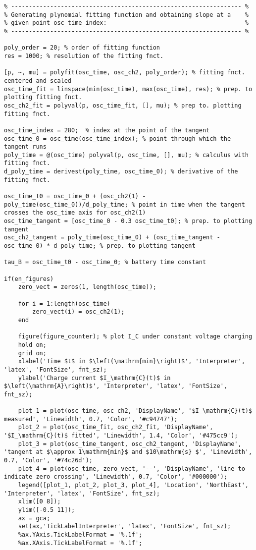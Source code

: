 \begin{lstlisting}
% ----------------------------------------------------------------- %
% Generating plynomial fitting function and obtaining slope at a    %
% given point osc_time_index:                                       %
% ----------------------------------------------------------------- %

poly_order = 20; % order of fitting function
res = 1000; % resolution of the fitting fnct.

[p, ~, mu] = polyfit(osc_time, osc_ch2, poly_order); % fitting fnct. centered and scaled
osc_time_fit = linspace(min(osc_time), max(osc_time), res); % prep. to plotting fitting fnct.
osc_ch2_fit = polyval(p, osc_time_fit, [], mu); % prep to. plotting fitting fnct.

osc_time_index = 280;  % index at the point of the tangent
osc_time_0 = osc_time(osc_time_index); % point through which the tangent runs  
poly_time = @(osc_time) polyval(p, osc_time, [], mu); % calculus with fitting fnct.
d_poly_time = derivest(poly_time, osc_time_0); % derivative of the fitting fnct.

osc_time_t0 = osc_time_0 + (osc_ch2(1) - poly_time(osc_time_0))/d_poly_time; % point in time when the tangent crosses the osc_time axis for osc_ch2(1) 
osc_time_tangent = [osc_time_0 - 0.3 osc_time_t0]; % prep. to plotting tangent
osc_ch2_tangent = poly_time(osc_time_0) + (osc_time_tangent - osc_time_0) * d_poly_time; % prep. to plotting tangent

tau_B = osc_time_t0 - osc_time_0; % battery time constant

if(en_figures)
    zero_vect = zeros(1, length(osc_time));
    
    for i = 1:length(osc_time)
        zero_vect(i) = osc_ch2(1);
    end
    
    figure(figure_counter); % plot I_C under constant voltage charging
    hold on;
    grid on;
    xlabel('Time $t$ in $\left(\mathrm{min}\right)$', 'Interpreter', 'latex', 'FontSize', fnt_sz);
    ylabel('Charge current $I_\mathrm{C}(t)$ in $\left(\mathrm{A}\right)$', 'Interpreter', 'latex', 'FontSize', fnt_sz);
    
    plot_1 = plot(osc_time, osc_ch2, 'DisplayName', '$I_\mathrm{C}(t)$ measured', 'Linewidth', 0.7, 'Color', '#c94747');
    plot_2 = plot(osc_time_fit, osc_ch2_fit, 'DisplayName', '$I_\mathrm{C}(t)$ fitted', 'Linewidth', 1.4, 'Color', '#475cc9');
    plot_3 = plot(osc_time_tangent, osc_ch2_tangent, 'DisplayName', 'tangent at $\approx 1\mathrm{min}$ and $10\mathrm{s} $', 'Linewidth', 0.7, 'Color', '#74c26d');
    plot_4 = plot(osc_time, zero_vect, '--', 'DisplayName', 'line to indicate zero crossing', 'Linewidth', 0.7, 'Color', '#000000');
    legend([plot_1, plot_2, plot_3, plot_4], 'Location', 'NorthEast', 'Interpreter', 'latex', 'FontSize', fnt_sz);
    xlim([0 8]);
    ylim([-0.5 11]);
    ax = gca;
    set(ax,'TickLabelInterpreter', 'latex', 'FontSize', fnt_sz);
    %ax.YAxis.TickLabelFormat = '%.1f';
    %ax.XAxis.TickLabelFormat = '%.1f';
    

\end{lstlisting}
